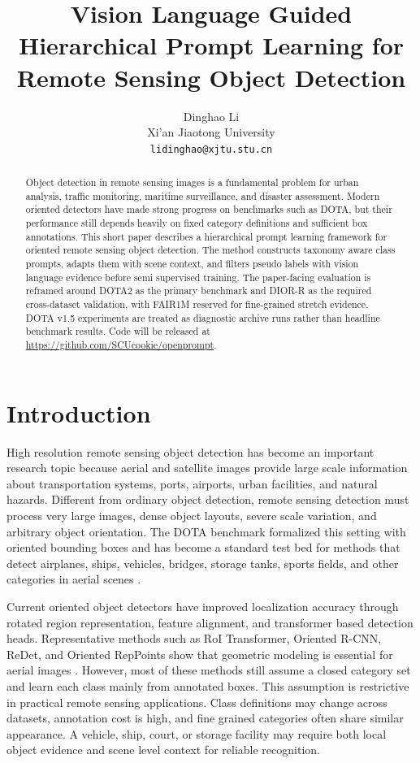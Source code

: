 \documentclass[10pt]{article}
\title{\vspace{-1.5em}Vision Language Guided Hierarchical Prompt Learning for Remote Sensing Object Detection}
\author{
Dinghao Li\\
Xi'an Jiaotong University\\
\texttt{lidinghao@xjtu.stu.cn}
}
\date{}
\begin{document}
\maketitle
\vspace{-1.5em}

\begin{abstract}
Object detection in remote sensing images is a fundamental problem for urban analysis, traffic monitoring, maritime surveillance, and disaster assessment. Modern oriented detectors have made strong progress on benchmarks such as DOTA, but their performance still depends heavily on fixed category definitions and sufficient box annotations. This short paper describes a hierarchical prompt learning framework for oriented remote sensing object detection. The method constructs taxonomy aware class prompts, adapts them with scene context, and filters pseudo labels with vision language evidence before semi supervised training. The paper-facing evaluation is reframed around DOTA2 as the primary benchmark and DIOR-R as the required cross-dataset validation, with FAIR1M reserved for fine-grained stretch evidence. DOTA v1.5 experiments are treated as diagnostic archive runs rather than headline benchmark results. Code will be released at \url{https://github.com/SCUcookie/openprompt}.
\end{abstract}

\section{Introduction}

High resolution remote sensing object detection has become an important research topic because aerial and satellite images provide large scale information about transportation systems, ports, airports, urban facilities, and natural hazards. Different from ordinary object detection, remote sensing detection must process very large images, dense object layouts, severe scale variation, and arbitrary object orientation. The DOTA benchmark formalized this setting with oriented bounding boxes and has become a standard test bed for methods that detect airplanes, ships, vehicles, bridges, storage tanks, sports fields, and other categories in aerial scenes \cite{xia2018dota}.

Current oriented object detectors have improved localization accuracy through rotated region representation, feature alignment, and transformer based detection heads. Representative methods such as RoI Transformer, Oriented R-CNN, ReDet, and Oriented RepPoints show that geometric modeling is essential for aerial images \cite{ding2019roit, xie2021orientedrcnn, han2021redet, li2022orientedreppoints}. However, most of these methods still assume a closed category set and learn each class mainly from annotated boxes. This assumption is restrictive in practical remote sensing applications. Class definitions may change across datasets, annotation cost is high, and fine grained categories often share similar appearance. A vehicle, ship, court, or storage facility may require both local object evidence and scene level context for reliable recognition.
\end{document}
